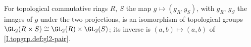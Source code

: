 For topological commutative rings $R$, $S$ the map $g\mapsto(g_R,g_S)$, with $g_R$, $g_S$ the images of $g$ under the two projections, is an isomorphism of topological groups $\GL_2(R\times S)\cong\GL_2(R)\times\GL_2(S)$; its inverse is $(a,b)\mapsto(a,b)$ of \cref{I.topgrp.def:gl2-pair}.
